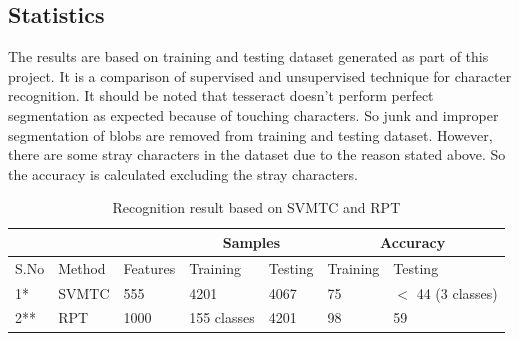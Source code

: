 \subsection{Statistics}
The results are based on training and testing dataset generated as part of this project. It is a
comparison of supervised and unsupervised technique for character recognition. It should be noted that
tesseract doesn't perform perfect segmentation as expected because of touching characters. 
So junk and improper segmentation of blobs are removed from training and testing dataset. 
However, there are some stray characters in the dataset due to the reason stated above. So the 
accuracy is calculated excluding the stray characters.
\begin{table}[!t]\center

\begin{tabular}{ | l | l | l | l | l | l | l |}
\hline
& & &  \multicolumn{2}{|c|}{Samples}&\multicolumn{2}{|c|}{Accuracy} \\ \hline
S.No & Method & Features &  Training &Testing & Training & Testing \\ \hline
1* & SVMTC & 555 & 4201 & 4067 & 75 & $<$ 44 (3 classes) \\ \hline
2** & RPT & 1000 & 155 classes& 4201 & 98 & 59 \\
\hline
\end{tabular}
\caption{Recognition result based on SVMTC and RPT } \label{RES}
\end{table}
